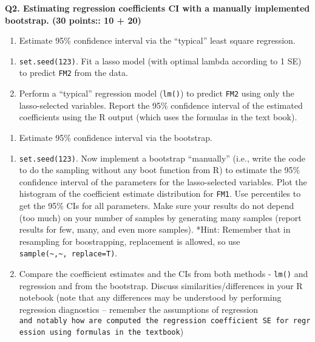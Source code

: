 \documentclass[
]{article}
\providecommand{\tightlist}{%
  \setlength{\itemsep}{0pt}\setlength{\parskip}{0pt}}
\begin{document}
\textbf{Q2. Estimating regression coefficients CI with a manually
implemented bootstrap. (30 points:: 10 + 20)}

\begin{enumerate}
\def\labelenumi{\arabic{enumi}.}
\tightlist
\item
  Estimate 95\% confidence interval via the ``typical'' least square
  regression.
\end{enumerate}

\begin{enumerate}
\def\labelenumi{\Alph{enumi}.}
\tightlist
\item
  \texttt{set.seed(123)}. Fit a lasso model (with optimal lambda
  according to 1 SE) to predict \texttt{FM2} from the data.
\item
  Perform a ``typical'' regression model (\texttt{lm()}) to predict
  \texttt{FM2} using only the lasso-selected variables. Report the 95\%
  confidence interval of the estimated coefficients using the R output
  (which uses the formulas in the text book).
\end{enumerate}

\begin{enumerate}
\def\labelenumi{\arabic{enumi}.}
\setcounter{enumi}{1}
\tightlist
\item
  Estimate 95\% confidence interval via the bootstrap.
\end{enumerate}

\begin{enumerate}
\def\labelenumi{\Alph{enumi}.}
\item
  \texttt{set.seed(123)}. Now implement a bootstrap ``manually'' (i.e.,
  write the code to do the sampling without any boot function from R) to
  estimate the 95\% confidence interval of the parameters for the
  lasso-selected variables. Plot the histogram of the coefficient
  estimate distribution for \texttt{FM1}. Use percentiles to get the
  95\% CIs for all parameters. Make sure your results do not depend (too
  much) on your number of samples by generating many samples (report
  results for few, many, and even more samples). *Hint: Remember that in
  resampling for boostrapping, replacement is allowed, so use
  \texttt{sample(\textasciitilde{},\textasciitilde{},\ replace=T)}.
\item
  Compare the coefficient estimates and the CIs from both methods -
  \texttt{lm()} and regression and from the bootstrap. Discuss
  similarities/differences in your R notebook (note that any differences
  may be understood by performing regression diagnostics -- remember the
  assumptions of regression
  \texttt{and\ notably\ how\ are\ computed\ the\ regression\ coefficient\ SE\ for\ regression\ using\ formulas\ in\ the\ textbook})
\end{enumerate}
\end{document}
